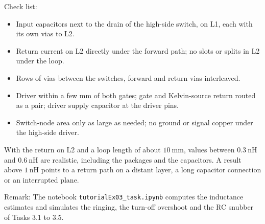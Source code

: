 
\begin{solutionblock}
	Check list:
	\begin{itemize}
		\item Input capacitors next to the drain of the high-side switch, on L1, each with its own vias to L2.
		\item Return current on L2 directly under the forward path; no slots or splits in L2 under the loop.
		\item Rows of vias between the switches, forward and return vias interleaved.
		\item Driver within a few mm of both gates; gate and Kelvin-source return routed as a pair; driver supply capacitor at the driver pins.
		\item Switch-node area only as large as needed; no ground or signal copper under the high-side driver.
	\end{itemize}
\end{solutionblock}


\begin{solutionblock}
	With the return on L2 and a loop length of about $\SI{10}{\milli\metre}$, values between $\SI{0.3}{\nano\henry}$ and $\SI{0.6}{\nano\henry}$ are realistic, including the packages and the capacitors. A result above $\SI{1}{\nano\henry}$ points to a return path on a distant layer, a long capacitor connection or an interrupted plane.
\end{solutionblock}

\vspace{0.5cm}
Remark: The notebook \texttt{tutorialEx03\_task.ipynb} computes the inductance estimates and simulates the ringing, the turn-off overshoot and the RC snubber of Tasks 3.1 to 3.5.
